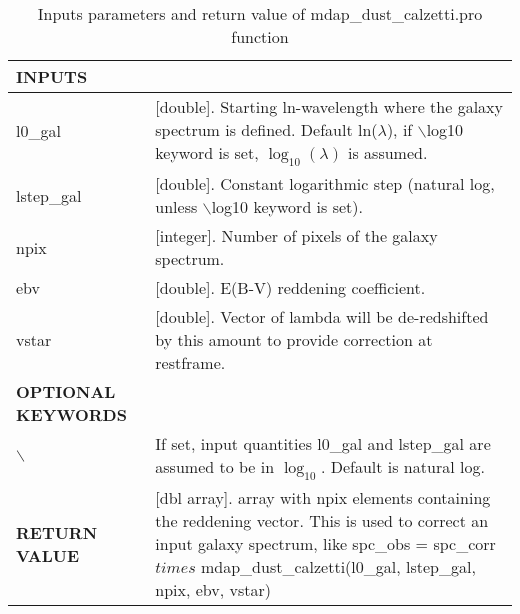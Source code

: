 \documentclass[11pt]{book}
\begin{document}
\begin{center}
\begin{longtable}{p{2.7cm}| p{11.1cm}}
\caption{Inputs parameters and return value of mdap\_dust\_calzetti.pro function} \label{dap_tab:mdap_dust_calzetti} \\
\hline
\endfirsthead
\hline
\endhead
\hline
\endlastfoot
\hline
{\bf  INPUTS}  & \\
\hline
l0\_gal & [double]. Starting ln-wavelength where the galaxy spectrum is defined. Default ln($\lambda$), if $\backslash$log10 keyword 
          is set, $\log_{10}(\lambda)$ is assumed. \\
%
lstep\_gal & [double]. Constant logarithmic step (natural log, unless  $\backslash$log10 keyword is set). \\
%
npix & [integer]. Number of pixels of the galaxy spectrum.\\
%
ebv & [double]. E(B-V) reddening coefficient.\\
%
vstar & [double]. Vector of lambda will be de-redshifted by this amount to provide correction at restframe.\\
\hline
{\bf  OPTIONAL KEYWORDS} & \\
$\backslash$ &  If set, input quantities l0\_gal and lstep\_gal are assumed to be in $\log_{10}$. Default is natural log.\\
\hline
{\bf  RETURN VALUE} & [dbl array]. array with npix elements containing the reddening vector. This is used to correct an input galaxy spectrum, like
spc\_obs = spc\_corr $times$ mdap\_dust\_calzetti(l0\_gal, lstep\_gal, npix, ebv, vstar)\\
\end{longtable}
\end{center}
\end{document}
